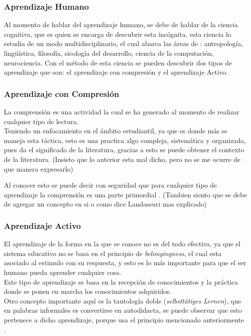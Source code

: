     \subsubsection{Aprendizaje Humano}
        Al momento de hablar del aprendizaje humano, se debe de hablar de la ciencia cognitiva, que es quien se encarga de descubrir esta incógnita,
        esta ciencia lo estudia de un modo multidisciplinario, el cual abarca las \'areas de \cite{bransford2000}: antropología, lingüística, 
        filosofía, sicología del desarrollo, ciencia de la computación, neurociencia.
        Con el método de esta ciencia se pueden descubrir dos tipos de aprendizaje que son: el aprendizaje con compresi\'on y el aprendizaje Activo.
        
        \subsubsection{Aprendizaje con Compresi\'on}
            La comprensi\'on es una actividad la cual se ha generado al momento de realizar cualquier tipo de lectura.\\
            Teniendo un enfocamiento en el \'ambito estudiantil, ya que es donde m\'as se maneja esta t\'actica, esto es una
            practica algo compleja, sistemática y organizada, pues da el significado de la literatura, gracias a esto se puede
            obtener el contexto de la literatura.
            (Insisto que lo anterior esta mal dicho, pero no se me ocurre de que manera expresarlo)

            Al conocer esto se puede decir con seguridad que para cualquier tipo de aprendizaje la comprensi\'on es 
            una parte primordial \cite{perez2014}.
            (Tambien siento que se debe de agregar un concepto en si o como dice Landassuri mas explicado)

        \subsubsection{Aprendizaje Activo}
            El aprendizaje de la forma en la que se conoce no es del todo efectiva, ya que el sistema educativo
            no se basa en el principio de \textit{belongingness}, el cual esta asociado al estimulo con su respuesta,
            y esto es lo m\'as importante para que el ser humano pueda aprender cualquier cosa.\\
            Este tipo de aprendizaje se basa en la recepci\'on de conocimientos y la pr\'actica donde se ponen en marcha los conocimientos adquiridos.\\
            Otro concepto importante aqu\'i es la tautolog\'ia doble (\textit{selbstt\"atiges Lernen}), que en palabras informales es convertirse en autodidacta, 
            se puede observar que esto pertenece a dicho aprendizaje, porque usa el principio mencionado anteriormente \cite{Huber2008}.
   

